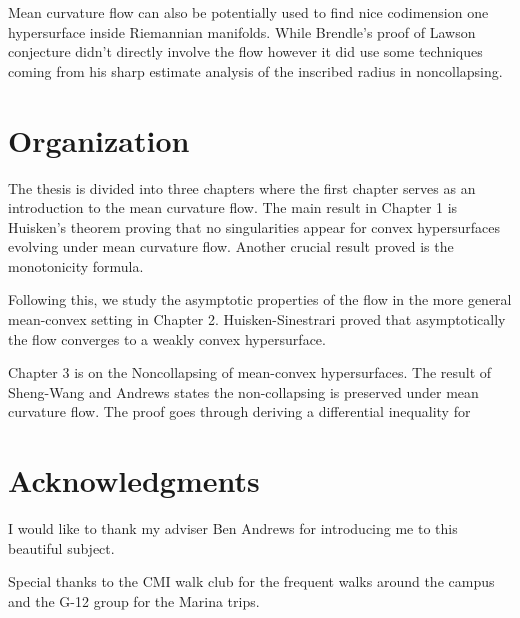 Mean curvature flow can also be potentially used to find nice codimension one hypersurface inside Riemannian manifolds. While Brendle's proof of Lawson conjecture didn't directly involve the flow however it did use some techniques coming from his sharp estimate analysis of the inscribed radius in noncollapsing. 

\section*{Organization}

The thesis is divided into three chapters where the first chapter serves as an introduction to the mean curvature flow. The main result in Chapter 1 is Huisken's theorem proving that no singularities appear for convex hypersurfaces evolving under mean curvature flow. Another crucial result proved is the monotonicity formula. 

Following this, we study the asymptotic properties of the flow in the more general mean-convex setting in Chapter 2. Huisken-Sinestrari proved that asymptotically the flow converges to a weakly convex hypersurface.  

Chapter 3 is on the Noncollapsing of mean-convex hypersurfaces. The result of Sheng-Wang and Andrews states the non-collapsing is preserved under mean curvature flow. The proof goes through deriving a differential inequality for 

\section*{Acknowledgments}

I would like to thank my adviser Ben Andrews for introducing me to this beautiful subject. 

Special thanks to the CMI walk club for the frequent walks around the campus and the G-12 group for the Marina trips. 